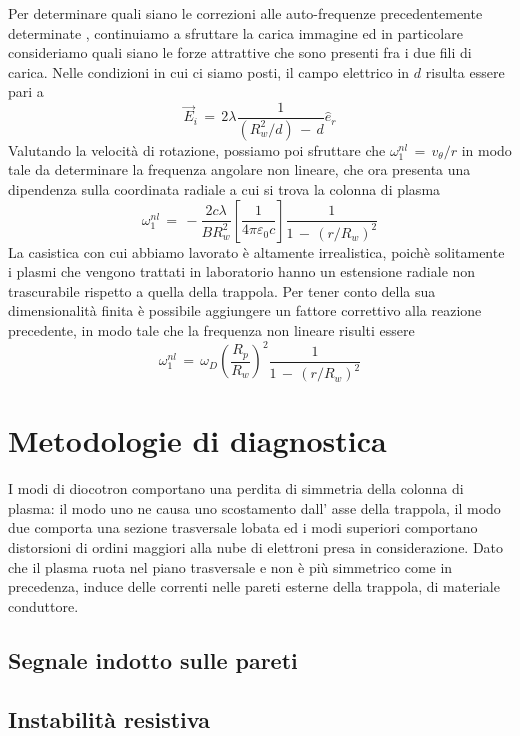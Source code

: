Per determinare quali siano le correzioni alle auto-frequenze precedentemente determinate , continuiamo a sfruttare la carica immagine 
ed in particolare consideriamo quali siano le forze attrattive che sono presenti fra i due fili di carica. Nelle condizioni in cui ci siamo 
posti, il campo elettrico in $d$ risulta essere pari a 
\begin{equation}
    \vec{E}_i\,=\,2\lambda\frac{1}{\left(R_w^2/d\right)\,-\,d}\hat{e}_r
    \label{equation: campo_offset}
\end{equation}
Valutando la velocità di rotazione, possiamo poi sfruttare che $\omega_1^{nl}\,=\,v_\theta/r$ in modo tale da determinare la frequenza 
angolare non lineare, che ora presenta una dipendenza sulla coordinata radiale a cui si trova la colonna di plasma
\begin{equation}
    \omega_1^{nl}\,=\,-\frac{2c\lambda}{BR_w^2}\left[\frac{1}{4\pi\varepsilon_0c}\right]\frac{1}{1\,-\,\left(r/R_w\right)^2}
    \label{equation: freqnl}
\end{equation}
La casistica con cui abbiamo lavorato è altamente irrealistica, poichè solitamente i plasmi che vengono trattati in laboratorio hanno 
un estensione radiale non trascurabile rispetto a quella della trappola. Per tener conto della sua dimensionalità finita è possibile 
aggiungere un fattore correttivo alla reazione precedente, in modo tale che la frequenza non lineare risulti essere 
\begin{equation}
    \omega_1^{nl}\,=\,\omega_D\left(\frac{R_p}{R_w}\right)^2\frac{1}{1\,-\,\left(r/R_w\right)^2}
    \label{equation: freqnl_dimFinita}
\end{equation}

\section{Metodologie di diagnostica}

I modi di diocotron comportano una perdita di simmetria della colonna di plasma: il modo uno ne causa uno scostamento dall'
asse della trappola, il modo due comporta una sezione trasversale lobata ed i modi superiori comportano distorsioni di ordini
maggiori alla nube di elettroni presa in considerazione. Dato che il plasma ruota nel piano trasversale e non è più simmetrico 
come in precedenza, induce delle correnti nelle pareti esterne della trappola, di materiale conduttore.

\subsection{Segnale indotto sulle pareti}

\subsection{Instabilità resistiva}
